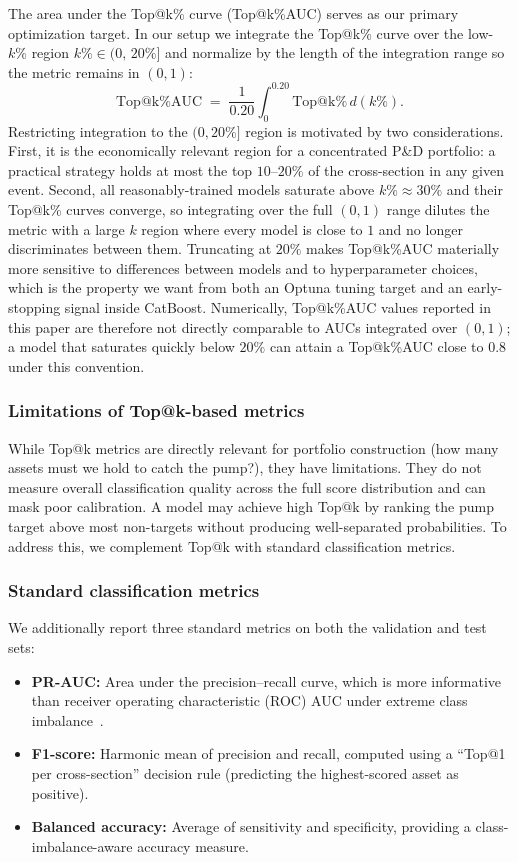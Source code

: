 \documentclass{ieeeaccess}
\begin{document}
The area under the Top@k\% curve (Top@k\%AUC) serves as our primary optimization target. In our setup we integrate the Top@k\% curve over the low-$k\%$ region $k\% \in (0,\,20\%]$ and normalize by the length of the integration range so the metric remains in $(0,1)$:
\begin{equation}
    \mathrm{Top@k\%AUC} \;=\; \frac{1}{0.20}\int_{0}^{0.20} \mathrm{Top@k\%}\,d(k\%).
    \label{eq:topkpauc}
\end{equation}
Restricting integration to the $(0,20\%]$ region is motivated by two considerations. First, it is the economically relevant region for a concentrated P\&D portfolio: a practical strategy holds at most the top $10$--$20\%$ of the cross-section in any given event. Second, all reasonably-trained models saturate above $k\% \approx 30\%$ and their Top@k\% curves converge, so integrating over the full $(0,1)$ range dilutes the metric with a large $k$ region where every model is close to $1$ and no longer discriminates between them. Truncating at $20\%$ makes Top@k\%AUC materially more sensitive to differences between models and to hyperparameter choices, which is the property we want from both an Optuna tuning target and an early-stopping signal inside CatBoost. Numerically, Top@k\%AUC values reported in this paper are therefore not directly comparable to AUCs integrated over $(0,1)$; a model that saturates quickly below $20\%$ can attain a Top@k\%AUC close to $0.8$ under this convention.

\subsubsection{Limitations of Top@k-based metrics}
While Top@k metrics are directly relevant for portfolio construction (how many assets must we hold to catch the pump?), they have limitations. They do not measure overall classification quality across the full score distribution and can mask poor calibration. A model may achieve high Top@k by ranking the pump target above most non-targets without producing well-separated probabilities. To address this, we complement Top@k with standard classification metrics.

\subsubsection{Standard classification metrics}
We additionally report three standard metrics on both the validation and test sets:
\begin{itemize}
    \item \textbf{PR-AUC:} Area under the precision--recall curve, which is more informative than receiver operating characteristic (ROC) AUC under extreme class imbalance~\cite{elkan2001cost}.
    \item \textbf{F1-score:} Harmonic mean of precision and recall, computed using a ``Top@1 per cross-section'' decision rule (predicting the highest-scored asset as positive).
    \item \textbf{Balanced accuracy:} Average of sensitivity and specificity, providing a class-imbalance-aware accuracy measure.
\end{itemize}
\end{document}
